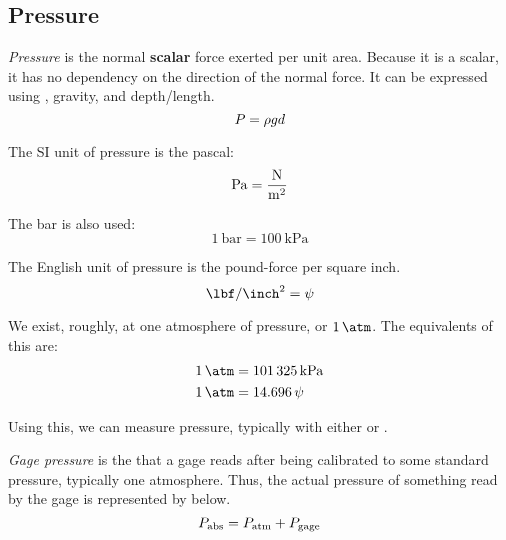 \subsection{Pressure}\label{subsec:Pressure}
\begin{definition}[Pressure]\label{def:Pressure}
  \emph{Pressure} is the normal \textbf{scalar} force exerted per unit area.
  Because it is a scalar, it has no dependency on the direction of the normal force.
  It can be expressed using , gravity, and depth/length.
  \begin{equation}\label{eq:Pressure}
    P = \rho g d
  \end{equation}

  The SI unit of pressure is the pascal:
  \begin{equation}\label{eq:Pressure_Pascal}
    \si{\pascal} = \si[per-mode=fraction]{\newton\per\meter\squared}
  \end{equation}

  The bar is also used:
  \begin{equation*}
    \SI{1}{\bar} = \SI{100}{\kilo\pascal}
  \end{equation*}

  The English unit of pressure is the pound-force per square inch.
  \begin{equation}\label{eq:Pressure_Bar}
    \si[per-mode=symbol]{\lbf\per\inch\squared} = \si{\psi}
  \end{equation}
\end{definition}

We exist, roughly, at one atmosphere of pressure, or $\SI{1}{\atm}$.
The equivalents of this are:
\begin{align*}
  \SI{1}{\atm} &= \SI{101325}{\kilo\pascal} \\
  \SI{1}{\atm} &= \SI{14.696}{\psi}
\end{align*}

Using this, we can measure pressure, typically with either  or .
\begin{definition}\label{def:Gage_Pressure}
  \emph{Gage pressure} is the  that a gage reads after being calibrated to some standard pressure, typically one atmosphere.
  Thus, the actual pressure of something read by the gage is represented by  below.
  \begin{equation}\label{eq:Gage_Pressure}
    P_{\mathrm{abs}} = P_{\mathrm{atm}} + P_{\mathrm{gage}}
  \end{equation}
\end{definition}

